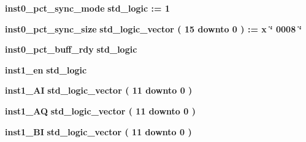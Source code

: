 \begin{DoxyCompactItemize}
\item 
{\bf inst0\+\_\+pct\+\_\+sync\+\_\+mode} {\bfseries \textcolor{comment}{std\+\_\+logic}\textcolor{vhdlchar}{ }\textcolor{vhdlchar}{ }\textcolor{vhdlchar}{\+:}\textcolor{vhdlchar}{=}\textcolor{vhdlchar}{ }\textcolor{vhdlchar}{ }\textcolor{vhdlchar}{\textquotesingle{}}\textcolor{vhdlchar}{ } \textcolor{vhdldigit}{1} \textcolor{vhdlchar}{ }\textcolor{vhdlchar}{\textquotesingle{}}\textcolor{vhdlchar}{ }} 
\item 
{\bf inst0\+\_\+pct\+\_\+sync\+\_\+size} {\bfseries \textcolor{comment}{std\+\_\+logic\+\_\+vector}\textcolor{vhdlchar}{ }\textcolor{vhdlchar}{(}\textcolor{vhdlchar}{ }\textcolor{vhdlchar}{ } \textcolor{vhdldigit}{15} \textcolor{vhdlchar}{ }\textcolor{keywordflow}{downto}\textcolor{vhdlchar}{ }\textcolor{vhdlchar}{ } \textcolor{vhdldigit}{0} \textcolor{vhdlchar}{ }\textcolor{vhdlchar}{)}\textcolor{vhdlchar}{ }\textcolor{vhdlchar}{ }\textcolor{vhdlchar}{ }\textcolor{vhdlchar}{\+:}\textcolor{vhdlchar}{=}\textcolor{vhdlchar}{ }\textcolor{vhdlchar}{ }\textcolor{vhdlchar}{x}\textcolor{vhdlchar}{ }\textcolor{keyword}{\char`\"{} 0008 \char`\"{}}\textcolor{vhdlchar}{ }} 
\item 
{\bf inst0\+\_\+pct\+\_\+buff\+\_\+rdy} {\bfseries \textcolor{comment}{std\+\_\+logic}\textcolor{vhdlchar}{ }} 
\item 
{\bf inst1\+\_\+en} {\bfseries \textcolor{comment}{std\+\_\+logic}\textcolor{vhdlchar}{ }} 
\item 
{\bf inst1\+\_\+\+AI} {\bfseries \textcolor{comment}{std\+\_\+logic\+\_\+vector}\textcolor{vhdlchar}{ }\textcolor{vhdlchar}{(}\textcolor{vhdlchar}{ }\textcolor{vhdlchar}{ } \textcolor{vhdldigit}{11} \textcolor{vhdlchar}{ }\textcolor{keywordflow}{downto}\textcolor{vhdlchar}{ }\textcolor{vhdlchar}{ } \textcolor{vhdldigit}{0} \textcolor{vhdlchar}{ }\textcolor{vhdlchar}{)}\textcolor{vhdlchar}{ }} 
\item 
{\bf inst1\+\_\+\+AQ} {\bfseries \textcolor{comment}{std\+\_\+logic\+\_\+vector}\textcolor{vhdlchar}{ }\textcolor{vhdlchar}{(}\textcolor{vhdlchar}{ }\textcolor{vhdlchar}{ } \textcolor{vhdldigit}{11} \textcolor{vhdlchar}{ }\textcolor{keywordflow}{downto}\textcolor{vhdlchar}{ }\textcolor{vhdlchar}{ } \textcolor{vhdldigit}{0} \textcolor{vhdlchar}{ }\textcolor{vhdlchar}{)}\textcolor{vhdlchar}{ }} 
\item 
{\bf inst1\+\_\+\+BI} {\bfseries \textcolor{comment}{std\+\_\+logic\+\_\+vector}\textcolor{vhdlchar}{ }\textcolor{vhdlchar}{(}\textcolor{vhdlchar}{ }\textcolor{vhdlchar}{ } \textcolor{vhdldigit}{11} \textcolor{vhdlchar}{ }\textcolor{keywordflow}{downto}\textcolor{vhdlchar}{ }\textcolor{vhdlchar}{ } \textcolor{vhdldigit}{0} \textcolor{vhdlchar}{ }\textcolor{vhdlchar}{)}\textcolor{vhdlchar}{ }} 

\end{DoxyCompactItemize}
